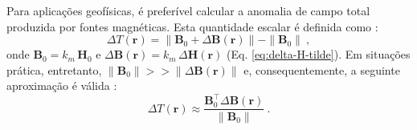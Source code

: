 Para aplicações geofísicas, é preferível calcular a anomalia de campo total produzida por fontes magnéticas. Esta quantidade escalar é definida como \citep{blakely1996}:
\begin{equation}
\Delta {T}({\mathbf{r}}) = \| 
{\mathbf{B}}_{0} + \Delta {\mathbf{B}}({\mathbf{r}}) \|
- \| {\mathbf{B}}_{0} \| \: ,
\label{eq:delta-T-tilde}
\end{equation}
onde ${\mathbf{B}}_{0} = k_{m} \, {\mathbf{H}}_{0}$
e $\Delta {\mathbf{B}}({\mathbf{r}}) = 
k_{m} \, \Delta {\mathbf{H}}({\mathbf{r}})$
(Eq. \ref{eq:delta-H-tilde}).
Em situações prática, entretanto, 
$\| {\mathbf{B}}_{0} \| >> \| \Delta {\mathbf{B}}({\mathbf{r}}) \|$
e, consequentemente, a seguinte aproximação é válida \citep{blakely1996}:
\begin{equation}
\Delta {T}({\mathbf{r}}) \approx  
\frac{{\mathbf{B}}_{0}^{\top} \Delta {\mathbf{B}}({\mathbf{r}})}{\| {\mathbf{B}}_{0} \|} \: .
\label{eq:delta-T-tilde-approx}
\end{equation}